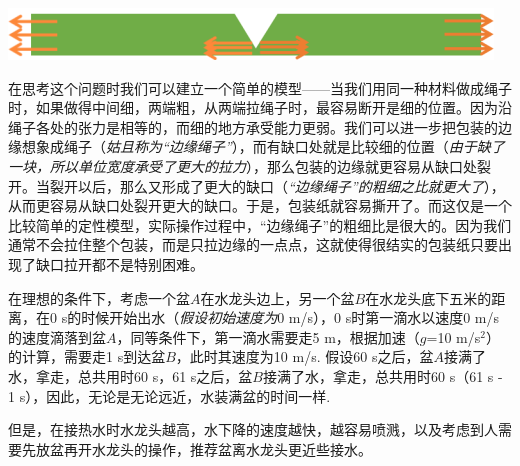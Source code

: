 \begin{multicols}{3}
\noindent\includegraphics[width=\linewidth]{IMG/201912/image12.png}
   
在思考这个问题时我们可以建立一个简单的模型——当我们用同一种材料做成绳子时，如果做得中间细，两端粗，从两端拉绳子时，最容易断开是细的位置。因为沿绳子各处的张力是相等的，而细的地方承受能力更弱。我们可以进一步把包装的边缘想象成绳子（\textit{姑且称为“边缘绳子”}），而有缺口处就是比较细的位置（\textit{由于缺了一块，所以单位宽度承受了更大的拉力}），那么包装的边缘就更容易从缺口处裂开。当裂开以后，那么又形成了更大的缺口（\textit{“边缘绳子”的粗细之比就更大了}），从而更容易从缺口处裂开更大的缺口。于是，包装纸就容易撕开了。而这仅是一个比较简单的定性模型，实际操作过程中，“边缘绳子”的粗细比是很大的。因为我们通常不会拉住整个包装，而是只拉边缘的一点点，这就使得很结实的包装纸只要出现了缺口拉开都不是特别困难。
 


\noindent{}

在理想的条件下，考虑一个盆$A$在水龙头边上，另一个盆$B$在水龙头底下五米的距离，在0 s的时候开始出水（\textit{假设初始速度为}0 m/s），0 s时第一滴水以速度0 m/s的速度滴落到盆$A$，同等条件下，第一滴水需要走5 m，根据加速（$g$=10 m/s$^2$）的计算，需要走1 s到达盆$B$，此时其速度为10 m/s. 假设60 s之后，盆$A$接满了水，拿走，总共用时60 s，61 s之后，盆$B$接满了水，拿走，总共用时60 s（61 s - 1 s），因此，无论是无论远近，水装满盆的时间一样. 

但是，在接热水时水龙头越高，水下降的速度越快，越容易喷溅，以及考虑到人需要先放盆再开水龙头的操作，推荐盆离水龙头更近些接水。\EOA

\end{multicols}
\vfil
\noindent\parbox{0.66\linewidth}{}\hfill

